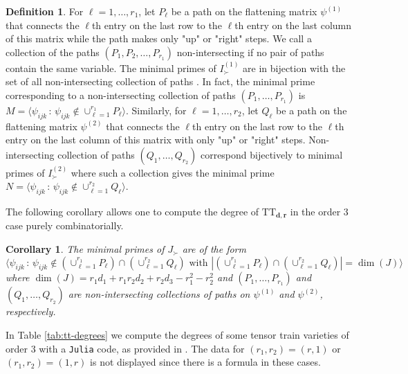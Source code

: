 \documentclass[12pt]{article}
\newtheorem{corollary}[theorem]{Corollary}
\theoremstyle{definition}
\newtheorem{definition}[theorem]{Definition}
\numberwithin{theorem}{section}
\begin{document}
\begin{definition} \label{defn:non-intersecting paths}
 For $\ell=1, \ldots, r_1$, let $P_\ell$ be 
a path on the flattening matrix $\psi^{(1)}$ that connects the $\ell$th entry on the last row  to the $\ell$th entry on the last column of this matrix while the path makes only "up" or "right" steps. We call a collection of the paths $(P_1, P_2, \ldots, P_{r_1})$ non-intersecting if no pair of paths contain the same variable. The minimal primes of $I^{(1)}_\succ$ are in bijection with the set of all non-intersecting collection of paths \cite[Proposition 4.4.1]{BCRV22}. In fact, the minimal prime corresponding to a non-intersecting collection of paths $(P_1, \ldots, P_{r_1})$  is
 $M = \langle \psi_{ijk}\, : \, \psi_{ijk} \not \in \cup_{\ell=1}^{r_1} P_\ell \rangle$. Similarly, for $\ell=1,\ldots, r_2$, let $Q_\ell$ be 
a path on the flattening matrix $\psi^{(2)}$ that connects the $\ell$th entry on the last row  to the $\ell$th entry on the last column of this matrix with only "up" or "right" steps. Non-intersecting collection of paths $(Q_1,\ldots, Q_{r_2})$ correspond bijectively to minimal primes of $I^{(2)}_\succ$ where such a collection gives the minimal prime $N = \langle \psi_{ijk}\, : \, \psi_{ijk} \not \in  \cup_{\ell=1}^{r_2} Q_\ell \rangle$.
\end{definition}
The following corollary allows one to compute the degree of $\mathrm{TT}_{\mathbf{d}, \mathbf{r}}$ in the order $3$ case purely combinatorially. 
\begin{corollary}
 The minimal primes of $J_\succ$ are of the form 
 $$ \langle \psi_{ijk} \, : \, \psi_{ijk} \not \in (\cup_{\ell=1}^{r_1} P_\ell) \cap  (\cup_{\ell=1}^{r_2} Q_\ell) \mbox{  with  } |(\cup_{\ell=1}^{r_1} P_\ell) \cap  (\cup_{\ell=1}^{r_2} Q_\ell)| = \dim(J) \rangle$$
 where $\dim(J)= r_1d_1 + r_1r_2d_2 +r_2d_3-r_1^2-r_2^2$ and $(P_1, \ldots, P_{r_1})$ and $(Q_1, \ldots, Q_{r_2})$ are non-intersecting collections of paths on $\psi^{(1)}$ and $\psi^{(2)}$, respectively. 
\end{corollary}
In Table \ref{tab:tt-degrees} we compute the degrees of some  tensor train varieties of order $3$ with a {\tt Julia} code, as provided in \cite{TensorTrainDegrees}. The data for $(r_1, r_2) = (r,1)$ or $(r_1, r_2) = (1,r)$ is not displayed since there is a formula in these cases. 
\end{document}
